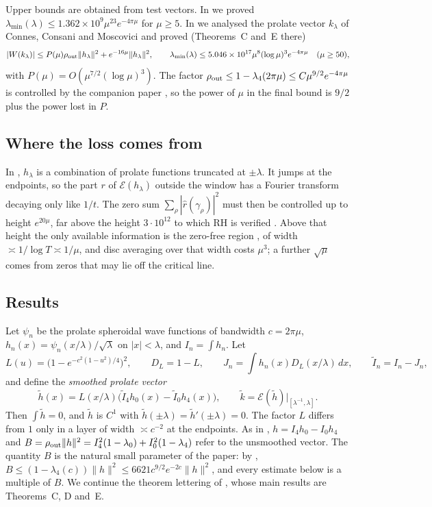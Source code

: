 \documentclass[11pt]{amsart}
\theoremstyle{remark}
\numberwithin{equation}{section}
\newcommand{\E}{\mathcal{E}}
\begin{document}
Upper bounds are obtained from test vectors. In \cite{MoriWWUB} we proved $\lambda_{\min}(\lambda)\le1.362\times10^9\mu^{23}e^{-4\pi\mu}$ for $\mu\ge5$. In \cite{MoriWeilII} we analysed the prolate vector $k_\lambda$ of Connes, Consani and Moscovici \cite[\S7]{CCM25} and proved (Theorems~C and~E there)
\[
|W(k_\lambda)|\le P(\mu)\rho_{\rm out}\|h_\lambda\|^2+e^{-16\mu}\|h_\lambda\|^2,\qquad
\lambda_{\min}(\lambda)\le5.046\times10^{17}\mu^8(\log\mu)^3e^{-4\pi\mu}\quad(\mu\ge50),
\]
with $P(\mu)=O(\mu^{7/2}(\log\mu)^3)$. The factor $\rho_{\rm out}\le1-\lambda_4(2\pi\mu)\le C\mu^{9/2}e^{-4\pi\mu}$ is controlled by the companion paper \cite{MoriPSWF}, so the power of $\mu$ in the final bound is $9/2$ plus the power lost in $P$.

\subsection{Where the loss comes from}
In \cite{MoriWeilII}, $h_\lambda$ is a combination of prolate functions truncated at $\pm\lambda$. It jumps at the endpoints, so the part $r$ of $\E(h_\lambda)$ outside the window has a Fourier transform decaying only like $1/t$. The zero sum $\sum_\rho|\hat r(\gamma_\rho)|^2$ must then be controlled up to height $e^{20\mu}$, far above the height $3\cdot10^{12}$ to which RH is verified \cite{PT21}. Above that height the only available information is the zero-free region \cite{MT15}, of width $\asymp1/\log T\asymp1/\mu$, and disc averaging over that width costs $\mu^3$; a further $\sqrt\mu$ comes from zeros that may lie off the critical line.

\subsection{Results}
Let $\psi_n$ be the prolate spheroidal wave functions of bandwidth $c=2\pi\mu$, $h_{n}(x)=\psi_n(x/\lambda)/\sqrt\lambda$ on $|x|<\lambda$, and $I_n=\int h_n$. Let
\[
L(u)=\bigl(1-e^{-c^2(1-u^2)/4}\bigr)^2,\qquad D_L=1-L,\qquad J_n=\int h_n(x)D_L(x/\lambda)\,dx,\qquad \tilde I_n=I_n-J_n,
\]
and define the \emph{smoothed prolate vector}
\[
\tilde h(x)=L(x/\lambda)\bigl(\tilde I_4h_0(x)-\tilde I_0h_4(x)\bigr),\qquad
\tilde k=\E(\tilde h)|_{[\lambda^{-1},\lambda]}.
\]
Then $\int\tilde h=0$, and $\tilde h$ is $C^1$ with $\tilde h(\pm\lambda)=\tilde h'(\pm\lambda)=0$. The factor $L$ differs from $1$ only in a layer of width $\asymp c^{-2}$ at the endpoints. As in \cite{MoriWeilII}, $h=I_4h_0-I_0h_4$ and $B=\rho_{\rm out}\|h\|^2=I_4^2(1-\lambda_0)+I_0^2(1-\lambda_4)$ refer to the unsmoothed vector. The quantity $B$ is the natural small parameter of the paper: by \cite{MoriPSWF}, $B\le(1-\lambda_4(c))\|h\|^2\le6621c^{9/2}e^{-2c}\|h\|^2$, and every estimate below is a multiple of $B$. We continue the theorem lettering of \cite{MoriWeilII}, whose main results are Theorems~C, D and~E.
\end{document}
